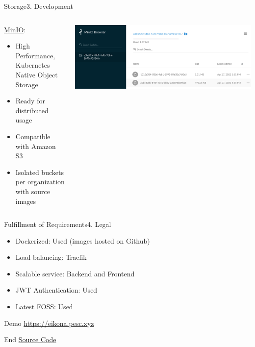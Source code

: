 \documentclass[aspectratio=169,20pt]{beamer}
\begin{document}
\begin{frame}{Storage}{3. Development}
	\begin{columns}[onlytextwidth,T]
		\begin{column}{.40\linewidth}
			\underline{MinIO}:
			\vspace{1in}
			\begin{itemize}
				\item{High Performance, Kubernetes Native Object Storage}
				\item{Ready for distributed usage}
				\item{Compatible with Amazon S3}
				\item{Isolated buckets per organization with source images}
			\end{itemize}
		\end{column}
		\begin{column}{.60\linewidth}
			\includegraphics[scale=0.45]{minio}
		\end{column}
	\end{columns}
\end{frame}

\begin{frame}{Fulfillment of Requirements}{4. Legal}
	\begin{itemize}
		\item{Dockerized: \textcolor{deepgreen}{Used (images hosted on Github)}}
		\item{Load balancing: \textcolor{deepgreen}{Traefik}}
		\item{Scalable service: \textcolor{deepgreen}{Backend and Frontend}}
		\item{JWT Authentication: \textcolor{deepgreen}{Used}}
		\item{Latest FOSS: \textcolor{deepgreen}{Used}}
	\end{itemize}
\end{frame}

\begin{frame}{Demo}{}
	\href{https://eikona.pesc.xyz/}{https://eikona.pesc.xyz}
\end{frame}

\begin{frame}{End}{}
	\href{https://github.com/eikona-org/eikona}{Source Code}
\end{frame}
\end{document}
